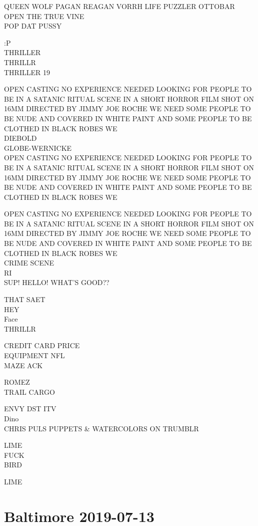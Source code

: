 \documentclass[10pt,letterpaper]{article}
\begin{document}
QUEEN WOLF PAGAN REAGAN VORRH LIFE PUZZLER OTTOBAR\\
OPEN THE TRUE VINE\\
POP DAT PUSSY

:P\\
THRILLER\\
THRILLR\\
THRILLER 19

OPEN CASTING NO EXPERIENCE NEEDED LOOKING FOR PEOPLE TO BE IN A SATANIC RITUAL SCENE IN A SHORT HORROR FILM SHOT ON 16MM DIRECTED BY JIMMY JOE ROCHE WE NEED SOME PEOPLE TO BE NUDE AND COVERED IN WHITE PAINT AND SOME PEOPLE TO BE CLOTHED IN BLACK ROBES WE\\
DIEBOLD\\
GLOBE{-}WERNICKE\\
OPEN CASTING NO EXPERIENCE NEEDED LOOKING FOR PEOPLE TO BE IN A SATANIC RITUAL SCENE IN A SHORT HORROR FILM SHOT ON 16MM DIRECTED BY JIMMY JOE ROCHE WE NEED SOME PEOPLE TO BE NUDE AND COVERED IN WHITE PAINT AND SOME PEOPLE TO BE CLOTHED IN BLACK ROBES WE

OPEN CASTING NO EXPERIENCE NEEDED LOOKING FOR PEOPLE TO BE IN A SATANIC RITUAL SCENE IN A SHORT HORROR FILM SHOT ON 16MM DIRECTED BY JIMMY JOE ROCHE WE NEED SOME PEOPLE TO BE NUDE AND COVERED IN WHITE PAINT AND SOME PEOPLE TO BE CLOTHED IN BLACK ROBES WE\\
CRIME SCENE\\
RI\\
SUP! HELLO!  WHAT'S GOOD??

THAT SAET\\
HEY\\
Face\\
THRILLR

CREDIT CARD PRICE\\
EQUIPMENT NFL\\
MAZE ACK

ROMEZ\\
TRAIL CARGO

ENVY DST ITV\\
Dino\\
CHRIS PULS PUPPETS \& WATERCOLORS ON TRUMBLR

LIME\\
FUCK\\
BIRD

LIME


\section*{Baltimore 2019-07-13}
\end{document}
